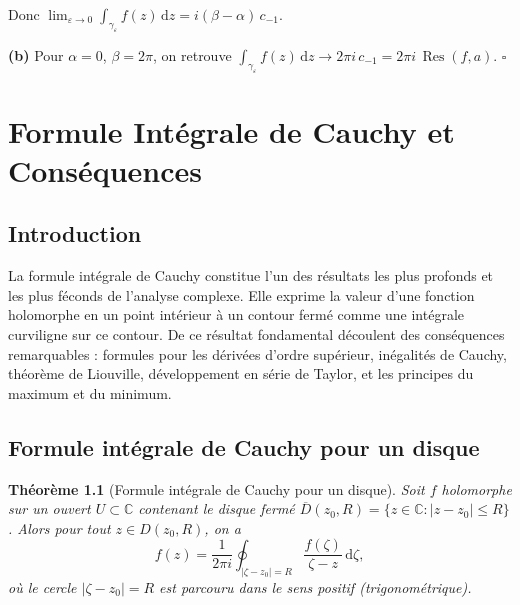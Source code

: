 \documentclass[12pt,a4paper,openany]{book}
\theoremstyle{definition}
\theoremstyle{plain}
\newtheorem{theoreme}[definition]{Théorème}
\theoremstyle{remark}
\newcommand{\C}{\mathbb{C}}
\DeclareMathOperator{\Res}{Res}
\newcommand{\dd}{\mathrm{d}}
\newcommand{\abs}[1]{\left|#1\right|}
\begin{document}
Donc $\lim_{\varepsilon\to 0}\int_{\gamma_\varepsilon}f(z)\,\dd z =
i(\beta-\alpha)\,c_{-1}$.

\textbf{(b)} Pour $\alpha = 0$, $\beta = 2\pi$, on retrouve
$\int_{\gamma_\varepsilon}f(z)\,\dd z \to 2\pi i\,c_{-1} = 2\pi i\,\Res(f,a)$.
\hfill$\square$
\chapter{Formule Intégrale de Cauchy et Conséquences}\label{chap:cauchy-integral}

\section{Introduction}

La formule intégrale de Cauchy constitue l'un des résultats les plus profonds
et les plus féconds de l'analyse complexe. Elle exprime la valeur d'une fonction
holomorphe en un point intérieur à un contour fermé comme une intégrale curviligne
sur ce contour. De ce résultat fondamental découlent des conséquences remarquables :
formules pour les dérivées d'ordre supérieur, inégalités de Cauchy, théorème de
Liouville, développement en série de Taylor, et les principes du maximum et du minimum.

\section{Formule intégrale de Cauchy pour un disque}

\begin{theoreme}[Formule intégrale de Cauchy pour un disque]\label{thm:cauchy-integral-disk}
Soit $f$ holomorphe sur un ouvert $U \subset \C$ contenant le disque fermé
$\overline{D}(z_0,R) = \{z \in \C : \abs{z-z_0} \leq R\}$. Alors pour tout
$z \in D(z_0,R)$, on a
\[
  f(z) = \frac{1}{2\pi i} \oint_{\abs{\zeta - z_0} = R}
         \frac{f(\zeta)}{\zeta - z} \, \dd\zeta,
\]
où le cercle $\abs{\zeta - z_0} = R$ est parcouru dans le sens positif
(trigonométrique).
\end{theoreme}
\end{document}
